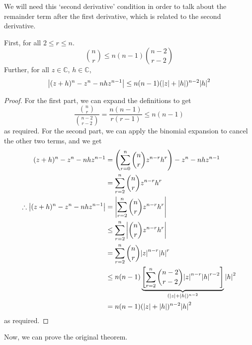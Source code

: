 We will need this `second derivative' condition in order to talk about the remainder term after the first derivative, which is related to the second derivative.
\begin{lemma}
	First, for all \(2 \leq r \leq n\).
	\[
		\binom{n}{r} \leq n(n-1)\binom{n-2}{r-2}
	\]
	Further, for all \(z \in \mathbb C\), \(h \in \mathbb C\),
	\[
		\abs{(z + h)^n - z^n - nhz^{n-1}} \leq n(n-1)(\abs{z} + \abs{h})^{n-2}\abs{h}^2
	\]
\end{lemma}
\begin{proof}
	For the first part, we can expand the definitions to get
	\[
		\frac{\binom{n}{r}}{\binom{n-2}{r-2}} = \frac{n(n-1)}{r(r-1)} \leq n(n-1)
	\]
	as required.
	For the second part, we can apply the binomial expansion to cancel the other two terms, and we get
	\begin{align*}
		(z + h)^n - z^n - nhz^{n-1}                  & = \left( \sum_{r=0}^n \binom{n}{r} z^{n-r} h^r \right)  - z^n - nhz^{n-1}                                                               \\
		                                             & = \sum_{r=2}^n \binom{n}{r} z^{n-r} h^r                                                                                                 \\
		\therefore \abs{(z + h)^n - z^n - nhz^{n-1}} & = \abs{\sum_{r=2}^n \binom{n}{r} z^{n-r} h^r}                                                                                           \\
		                                             & \leq \sum_{r=2}^n \abs{\binom{n}{r} z^{n-r} h^r}                                                                                        \\
		                                             & = \sum_{r=2}^n \binom{n}{r} \abs{z}^{n-r} \abs{h}^r                                                                                     \\
		                                             & \leq n(n-1) \underbrace{\left[ \sum_{r=2}^n \binom{n-2}{r-2} \abs{z}^{n-r} \abs{h}^{r-2} \right]}_{(\abs{z} + \abs{h})^{n-2}} \abs{h}^2 \\
		                                             & = n(n-1) (\abs{z} + \abs{h})^{n-2} \abs{h}^2                                                                                            \\
	\end{align*}
	as required.
\end{proof}
Now, we can prove the original theorem.
